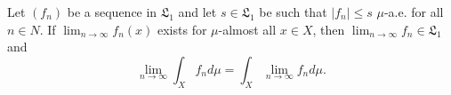 Let $(f_n)$ be a sequence in $\mathfrak{L}_1$ and let $s \in \mathfrak{L}_1$ be such that $|f_n| \leq s$ $\mu$-a.e. for all $n \in N$. If $\lim_{n \to \infty} f_n(x)$ exists for $\mu$-almost all $x \in X$, then $\lim_{n \to \infty} f_n \in \mathfrak{L}_1$ and $$\lim_{n \to \infty} \int_X f_n d\mu = \int_X \lim_{n \to \infty} f_n d\mu.$$
